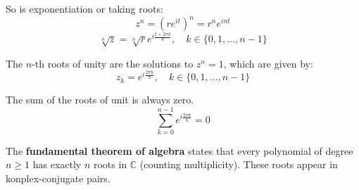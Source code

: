 \begin{example}
    So is exponentiation or taking roots:
    $$z^n = (r e^{it})^n = r^n e^{int}$$
    $$\sqrt[n]{z} = \sqrt[n]{r} e^{i\frac{t+2\pi k}{n}}, \quad k \in \{0, 1, \dots, n-1\}$$
\end{example}

\begin{definition}
    The $n$-th roots of unity are the solutions to $z^n = 1$, which are given by:
    $$z_k = e^{i\frac{2\pi k}{n}}, \quad k \in \{0, 1, \dots, n-1\}$$
\end{definition}

\begin{theorem}
    The sum of the roots of unit is always zero.
    $$\sum_{k=0}^{n-1} e^{i\frac{2\pi k}{n}} = 0$$
\end{theorem}

\begin{theorem}
    The \textbf{fundamental theorem of algebra} states that every polynomial of degree $n \geq 1$ has exactly $n$ roots in $\mathbb{C}$ (counting multiplicity). These roots appear in konplex-conjugate pairs.
\end{theorem}
